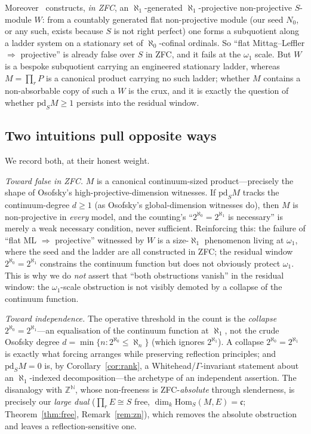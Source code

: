 \documentclass[11pt,reqno]{amsart}
\theoremstyle{plain}
\theoremstyle{definition}
\theoremstyle{remark}
\newcommand{\Hom}{\mathrm{Hom}}
\newcommand{\pd}{\mathrm{pd}}
\newcommand{\N}{\mathbb{N}}
\newcommand{\Z}{\mathbb{Z}}
\begin{document}
Moreover~\cite[\S5]{herbera-trlifaj} constructs, \emph{in ZFC}, an $\aleph_1$-generated $\aleph_1$-projective non-projective $S$-module $W$: from a countably generated flat non-projective module (our seed $N_0$, or any such, exists because $S$ is not right perfect) one forms a subquotient along a ladder system on a stationary set of $\aleph_0$-cofinal ordinals. So ``flat Mittag--Leffler $\Rightarrow$ projective'' is already false over $S$ in ZFC, and it fails at the $\omega_1$ scale. But $W$ is a bespoke subquotient carrying an engineered stationary ladder, whereas $M=\prod_r P$ is a canonical product carrying no such ladder; whether $M$ contains a non-absorbable copy of such a $W$ is the crux, and it is exactly the question of whether $\pd_S M\ge1$ persists into the residual window.

\subsection*{Two intuitions pull opposite ways}
We record both, at their honest weight.

\emph{Toward false in ZFC.} $M$ is a canonical continuum-sized product---precisely the shape of Osofsky's high-projective-dimension witnesses. If $\pd_S M$ tracks the continuum-degree $d\ge1$ (as Osofsky's global-dimension witnesses do), then $M$ is non-projective in \emph{every} model, and the counting's ``$2^{\aleph_0}=2^{\aleph_1}$ is necessary'' is merely a weak necessary condition, never sufficient. Reinforcing this: the failure of ``flat ML $\Rightarrow$ projective'' witnessed by $W$ is a size-$\aleph_1$ phenomenon living at $\omega_1$, where the seed and the ladder are all constructed in ZFC; the residual window $2^{\aleph_0}=2^{\aleph_1}$ constrains the continuum function but does not obviously protect $\omega_1$. This is why we do \emph{not} assert that ``both obstructions vanish'' in the residual window: the $\omega_1$-scale obstruction is not visibly demoted by a collapse of the continuum function.

\emph{Toward independence.} The operative threshold in the count is the \emph{collapse} $2^{\aleph_0}=2^{\aleph_1}$---an equalisation of the continuum function at $\aleph_1$, not the crude Osofsky degree $d=\min\{n:2^{\aleph_0}\le\aleph_n\}$ (which ignores $2^{\aleph_1}$). A collapse $2^{\aleph_0}=2^{\aleph_1}$ is exactly what forcing arranges while preserving reflection principles; and $\pd_S M=0$ is, by Corollary~\ref{cor:rank}, a Whitehead/$\Gamma$-invariant statement about an $\aleph_1$-indexed decomposition---the archetype of an independent assertion. The disanalogy with $\Z^{\N}$, whose non-freeness is ZFC-\emph{absolute} through slenderness, is precisely our \emph{large dual} ($\prod_r E\cong S$ free, $\dim_k\Hom_S(M,E)=\mathfrak c$; Theorem~\ref{thm:free}, Remark~\ref{rem:zn}), which removes the absolute obstruction and leaves a reflection-sensitive one.
\end{document}
